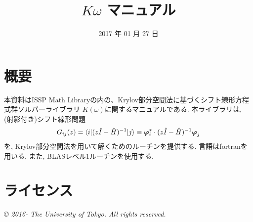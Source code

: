 \documentclass[letterpaper,10pt,dvipdfmx,openany]{sphinxmanual}
\title{$K\omega$ マニュアル}
\date{2017 年 01 月 27 日}
\author{}
\begin{document}
\maketitle
\tableofcontents
{}\label{index::doc}



\chapter{概要}
\label{komega_overview_ja::doc}\label{komega_overview_ja:welcome-to-s-documentation}\label{komega_overview_ja:id1}
本資料はISSP Math
Libraryの内の、Krylov部分空間法に基づくシフト線形方程式群ソルバーライブラリ
\(K(\omega)\)に関するマニュアルである. 本ライブラリは,
(射影付き)シフト線形問題
\begin{gather}
\begin{split}\begin{align}
  G_{i j}(z) = \langle i | (z {\hat I} -{\hat H})^{-1}| j \rangle \equiv
  {\boldsymbol \varphi}_i^{*} \cdot (z{\hat I}-{\hat H})^{-1} {\boldsymbol \varphi}_j
  \end{align}\end{split}\notag
\end{gather}
を, Krylov部分空間法を用いて解くためのルーチンを提供する.
言語はfortranを用いる. また, BLASレベル1ルーチンを使用する.


\chapter{ライセンス}
\label{komega_copyright_ja::doc}\label{komega_copyright_ja:id1}
\emph{© 2016- The University of Tokyo. All rights reserved.}
\end{document}
